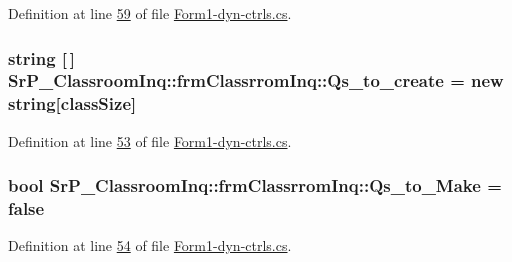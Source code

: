 \-Definition at line \hyperlink{_form1-dyn-ctrls_8cs_source_l00059}{59} of file \hyperlink{_form1-dyn-ctrls_8cs_source}{\-Form1-\/dyn-\/ctrls.\-cs}.

\hypertarget{class_sr_p___classroom_inq_1_1frm_classrrom_inq_a04ea330233515e3af7d23fcd501364cc}{
\subsubsection[{\-Qs\-\_\-to\-\_\-create}]{\setlength{\rightskip}{0pt plus 5cm}string \mbox{[}$\,$\mbox{]} {\bf \-Sr\-P\-\_\-\-Classroom\-Inq\-::frm\-Classrrom\-Inq\-::\-Qs\-\_\-to\-\_\-create} = new string\mbox{[}{\bf class\-Size}\mbox{]}}}
\label{class_sr_p___classroom_inq_1_1frm_classrrom_inq_a04ea330233515e3af7d23fcd501364cc}


\-Definition at line \hyperlink{_form1-dyn-ctrls_8cs_source_l00053}{53} of file \hyperlink{_form1-dyn-ctrls_8cs_source}{\-Form1-\/dyn-\/ctrls.\-cs}.

\hypertarget{class_sr_p___classroom_inq_1_1frm_classrrom_inq_a74b0b2afc18cdf1d19dc415ab870e68b}{
\subsubsection[{\-Qs\-\_\-to\-\_\-\-Make}]{\setlength{\rightskip}{0pt plus 5cm}bool {\bf \-Sr\-P\-\_\-\-Classroom\-Inq\-::frm\-Classrrom\-Inq\-::\-Qs\-\_\-to\-\_\-\-Make} = false}}
\label{class_sr_p___classroom_inq_1_1frm_classrrom_inq_a74b0b2afc18cdf1d19dc415ab870e68b}


\-Definition at line \hyperlink{_form1-dyn-ctrls_8cs_source_l00054}{54} of file \hyperlink{_form1-dyn-ctrls_8cs_source}{\-Form1-\/dyn-\/ctrls.\-cs}.

